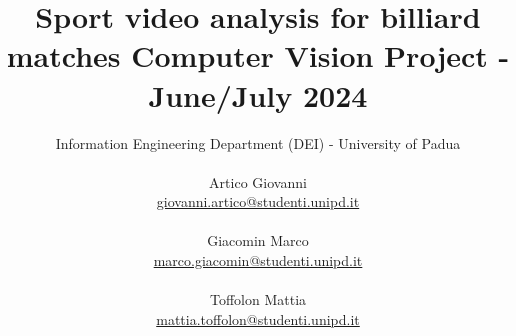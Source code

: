 \documentclass{article}
\title{\huge \textbf{Sport video analysis for billiard matches} \newline \Large Computer Vision Project - June/July 2024
}
\author{Information Engineering Department (DEI) - University of Padua \\ \\
        Artico Giovanni \\ \href{mailto:giovanni.artico@studenti.unipd.it}{giovanni.artico@studenti.unipd.it} \\ \\
        Giacomin Marco \\  \href{mailto:marco.giacomin@studenti.unipd.it}{marco.giacomin@studenti.unipd.it} \\ \\
        Toffolon Mattia \\ \href{mailto:mattia.toffolon@studenti.unipd.it}{mattia.toffolon@studenti.unipd.it} 
}
\date{}
\begin{document}
\maketitle
\vspace{10mm}
\tableofcontents
\thispagestyle{empty}

\newpage
{}















\label{sec:performance}











\end{document}
